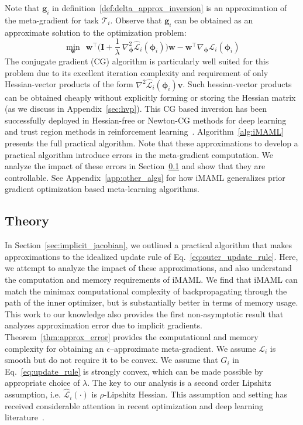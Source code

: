 \documentclass{article} \usepackage[nonatbib, final]{mod_neurips}
\newcommand{\eye}{\boldsymbol{I}}
\newcommand{\task}{\mathcal{T}}
\newcommand{\param}{{\bm{\phi}}}               \newcommand{\paramspace}{\Phi}
\newcommand{\fn}{\mathcal{L}}                  \newcommand{\udfn}{\tilde{\fn}}        \newcommand{\fnht}{\hat{\fn}}        \newcommand{\ud}{\alg}
\newcommand{\pgrad}{\nabla}
\begin{document}
Note that $\bm{g}_i$ in definition~\ref{def:delta_approx_inversion} is
an approximation of the meta-gradient for task $\task_i$. Observe that $\bm{g}_i$ can be obtained as an approximate solution to the optimization problem:
\begin{equation}\label{eq:sub_problem}
\min_{\bm{w}} \ \ \bm{w}^\top \bigg(\eye + \frac{1}{\lambda}~\pgrad_\param^2 \fnht_i(\param_i) \bigg) \bm{w} - \bm{w}^\top \pgrad_\param \fn_i(\param_i)
\end{equation}
The conjugate gradient (CG) algorithm is particularly well suited for this problem due to its excellent iteration complexity and requirement of only Hessian-vector products of
the form $\pgrad^2 \fnht_i(\param_i) \bm{v} $. Such hessian-vector products can be obtained cheaply without explicitly forming or storing the Hessian matrix (as we discuss in Appendix~\ref{sec:hvp}).
This CG
based inversion has been successfully deployed in Hessian-free or
Newton-CG methods for deep
learning~\cite{Martens2010DeepLV,NocedalBook} and trust region methods
in reinforcement
learning~\cite{trpo,Rajeswaran17nips}. Algorithm~\ref{alg:iMAML}
presents the full practical algorithm. Note that these approximations
to develop a practical algorithm introduce errors in the meta-gradient
computation. We analyze the impact of these errors in
Section~\ref{sec:analysis} and show that they are controllable. See Appendix~\ref{app:other_algs} for how iMAML generalizes prior gradient optimization based meta-learning algorithms.


\subsection{Theory}
\label{sec:analysis}
In Section~\ref{sec:implicit_jacobian}, we outlined a practical algorithm that makes approximations to the idealized update rule of Eq.~\ref{eq:outer_update_rule}. Here, we attempt to analyze the impact of these approximations, and also understand the computation and memory requirements of iMAML. We find that iMAML can match the minimax computational complexity of backpropagating through the path of the inner optimizer, but is substantially better in terms of memory usage. This work to our knowledge also provides the first non-asymptotic result that analyzes approximation error due to implicit gradients. Theorem~\ref{thm:approx_error} provides the computational and memory complexity for obtaining an $\epsilon$--approximate meta-gradient. We assume $\fn_i$ is smooth but do not require it to be convex. We assume that $G_i$ in Eq.~\ref{eq:update_rule} is strongly convex, which can be
made possible by appropriate choice of $\lambda$. The key to our analysis is a second order Lipshitz assumption, i.e. $\fnht_i (\cdot)$
is $\rho$-Lipshitz Hessian. This assumption and setting has received
considerable attention in recent optimization and deep learning
literature~\cite{Jin2017HowTE, Nesterov2006CubicRO}. 
\end{document}
